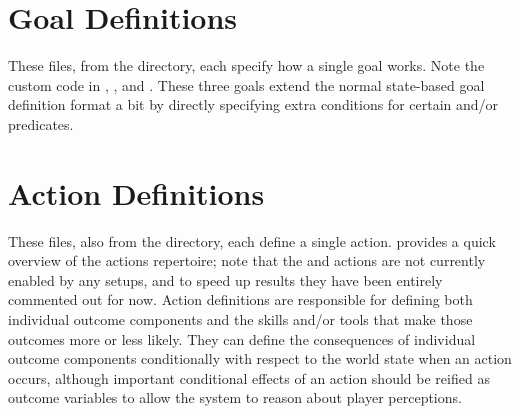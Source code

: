 \section{Goal Definitions}

These files, from the  directory, each specify how a single goal works.
%
Note the custom code in , , and .
%
These three goals extend the normal state-based goal definition format a bit by directly specifying extra conditions for certain  and/or  predicates.


\section{Action Definitions}

These files, also from the  directory, each define a single action.
%
 provides a quick overview of the actions repertoire; note that the   and  actions are not currently enabled by any setups, and to speed up results they have been entirely commented out for now.
%
Action definitions are responsible for defining both individual outcome components and the skills and/or tools that make those outcomes more or less likely.
%
They can define the consequences of individual outcome components conditionally with respect to the world state when an action occurs, although important conditional effects of an action should be reified as outcome variables to allow the system to reason about player perceptions.

